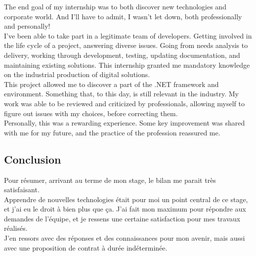 \documentclass{rapport}
\begin{document}
The end goal of my internship was to both discover new technologies and corporate world. And I'll have to admit, I wasn't let down, both professionally and personally!\\

I've been able to take part in a legitimate team of developers. Getting involved in the life cycle of a project, answering diverse issues. Going from needs analysis to delivery, working through development, testing, updating documentation, and maintaining existing solutions. This internship granted me mandatory knowledge on the industrial production of digital solutions.\\

This project allowed me to discover a part of the .NET framework and environment. Something that, to this day, is still relevant in the industry.
My work was able to be reviewed and criticized by professionals, allowing myself to figure out issues with my choices, before correcting them.\\

Personally, this was a rewarding experience. Some key  improvement was shared with me for my future, and the practice of the profession reassured me.

\subsection*{Conclusion}
Pour résumer, arrivant au terme de mon stage, le bilan me parait très satisfaisant. \\
Apprendre de nouvelles technologies était pour moi un point central de ce stage, et j'ai eu le droit à bien plus que ça. J'ai fait mon maximum pour répondre aux demandes de l'équipe, et je ressens une certaine satisfaction pour mes travaux réalisés. \\
J'en ressors avec des réponses et des connaissances pour mon avenir, mais aussi avec une proposition de contrat à durée indéterminée.
\end{document}

